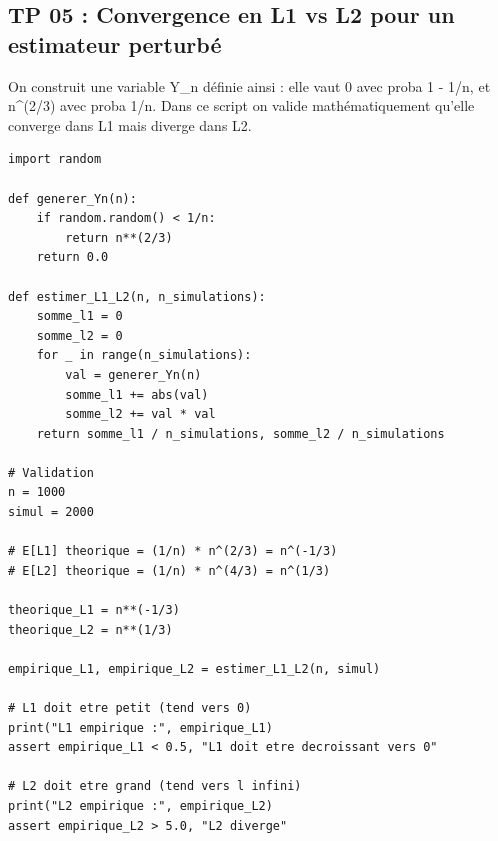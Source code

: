 \documentclass[11pt,a4paper]{article}
\begin{document}
\subsection*{TP 05 : Convergence en L1 vs L2 pour un estimateur perturbé}

On construit une variable Y_n définie ainsi : elle vaut 0 avec proba 1 - 1/n,
et n^(2/3) avec proba 1/n.
Dans ce script on valide mathématiquement qu'elle converge dans L1 mais diverge dans L2.

\begin{lstlisting}
import random

def generer_Yn(n):
    if random.random() < 1/n:
        return n**(2/3)
    return 0.0

def estimer_L1_L2(n, n_simulations):
    somme_l1 = 0
    somme_l2 = 0
    for _ in range(n_simulations):
        val = generer_Yn(n)
        somme_l1 += abs(val)
        somme_l2 += val * val
    return somme_l1 / n_simulations, somme_l2 / n_simulations

# Validation
n = 1000
simul = 2000

# E[L1] theorique = (1/n) * n^(2/3) = n^(-1/3)
# E[L2] theorique = (1/n) * n^(4/3) = n^(1/3)

theorique_L1 = n**(-1/3)
theorique_L2 = n**(1/3)

empirique_L1, empirique_L2 = estimer_L1_L2(n, simul)

# L1 doit etre petit (tend vers 0)
print("L1 empirique :", empirique_L1)
assert empirique_L1 < 0.5, "L1 doit etre decroissant vers 0"

# L2 doit etre grand (tend vers l infini)
print("L2 empirique :", empirique_L2)
assert empirique_L2 > 5.0, "L2 diverge"
\end{lstlisting}
\end{document}
